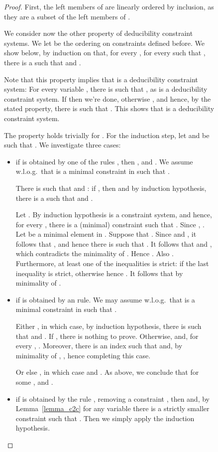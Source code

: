 \documentclass[acmtocl,acmnow]{acmtrans2m}
\newcommand{\dedsys}[1]{deducibility constraint system}
\newcommand{\dedsyss}[1]{deducibility constraint systems}
\begin{document}
\begin{figure}[t]
{{\begin{proof}
First, the left members of  are linearly ordered by inclusion, as
they are a subset of the left members of . 

We consider now the other property of \dedsyss{}.
We let  be the ordering on constraints defined before. 
We show below, by induction on  that, for every ,
for every  such that ,
there is a  such that 
and . 

Note that this property implies that  is a \dedsys{}: For every
variable , there is  such that
, as  is a \dedsys{}.  If
 then we're done, otherwise , and hence, by the stated property, there is  such that . This shows that
 is a \dedsys{}.

The property holds trivially for . For the induction step,
let   and   be such that .
We investigate three cases:
\begin{itemize}
\item if  is obtained by one of the rules , then ,
and .
We assume w.l.o.g.~that  is a minimal constraint in  such
that . 

There is  such that  and :
if , then  and
by induction hypothesis, there is a  such that 
 and .

Let . By induction
hypothesis  is a constraint system, and hence, for every , there is a (minimal) constraint  such that
. Since ,
.  Let  be a minimal element in
. 
Suppose that .  Since  and
, it follows that , and hence
there is  such that . It
follows that  and , which contradicts the
minimality of . Hence .
Also . Furthermore, at least one of the
inequalities is strict: if  the last inequality is
strict, otherwise  hence
.  It follows that
 by minimality of
.













\item if  is obtained by an  rule. 
We may assume w.l.o.g.~that  is a minimal constraint in  such that . 

Either ,
in which case, by induction hypothesis, there is  such
that  and . 
If , there
is nothing to prove. Otherwise,  and, for every ,
. 
Moreover, there is an index  such that
 and, by minimality of , , hence completing this case.

Or else , in which case  and . As above, we conclude that for some
,  and .

\item if  is obtained by the rule , removing a constraint , then  and, by Lemma~\ref{lemma_c2c} for any variable  there is a strictly smaller constraint  such that
. Then we simply apply the induction hypothesis.
\end{itemize}
\end{proof}

















}}
\end{figure}
\end{document}
